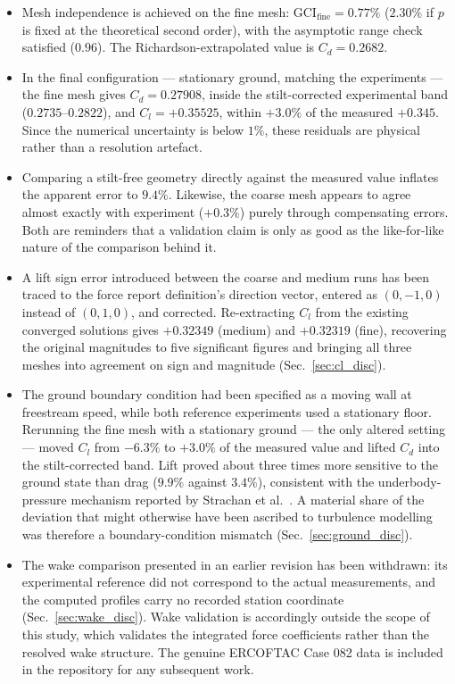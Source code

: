 \documentclass[12pt,a4paper]{article}
\begin{document}
\begin{itemize}
  \item Mesh independence is achieved on the fine mesh: $\text{GCI}_\text{fine} = 0.77\%$ ($2.30\%$
  if $p$ is fixed at the theoretical second order), with the asymptotic range check satisfied
  ($0.96$). The Richardson-extrapolated value is $C_d = 0.2682$.
  \item In the final configuration — stationary ground, matching the experiments — the fine mesh
  gives $C_d = 0.27908$, inside the stilt-corrected experimental band ($0.2735$–$0.2822$), and
  $C_l = +0.35525$, within $+3.0\%$ of the measured $+0.345$. Since the numerical uncertainty is
  below $1\%$, these residuals are physical rather than a resolution artefact.
  \item Comparing a stilt-free geometry directly against the measured value inflates the apparent
  error to $9.4\%$. Likewise, the coarse mesh appears to agree almost exactly with experiment
  ($+0.3\%$) purely through compensating errors. Both are reminders that a validation claim is only
  as good as the like-for-like nature of the comparison behind it.
  \item A lift sign error introduced between the coarse and medium runs has been traced to the force
  report definition's direction vector, entered as $(0,-1,0)$ instead of $(0,1,0)$, and corrected.
  Re-extracting $C_l$ from the existing converged solutions gives $+0.32349$ (medium) and $+0.32319$
  (fine), recovering the original magnitudes to five significant figures and bringing all three
  meshes into agreement on sign and magnitude (Sec.~\ref{sec:cl_disc}).
  \item The ground boundary condition had been specified as a moving wall at freestream speed, while
  both reference experiments used a stationary floor. Rerunning the fine mesh with a stationary
  ground — the only altered setting — moved $C_l$ from $-6.3\%$ to $+3.0\%$ of the measured value
  and lifted $C_d$ into the stilt-corrected band. Lift proved about three times more sensitive to
  the ground state than drag ($9.9\%$ against $3.4\%$), consistent with the underbody-pressure
  mechanism reported by Strachan et al.~\cite{strachan2007}. A material share of the deviation that
  might otherwise have been ascribed to turbulence modelling was therefore a boundary-condition
  mismatch (Sec.~\ref{sec:ground_disc}).
  \item The wake comparison presented in an earlier revision has been withdrawn: its experimental
  reference did not correspond to the actual measurements, and the computed profiles carry no
  recorded station coordinate (Sec.~\ref{sec:wake_disc}). Wake validation is accordingly outside the
  scope of this study, which validates the integrated force coefficients rather than the resolved
  wake structure. The genuine ERCOFTAC Case 082 data is included in the repository for any
  subsequent work.
\end{itemize}
\end{document}
